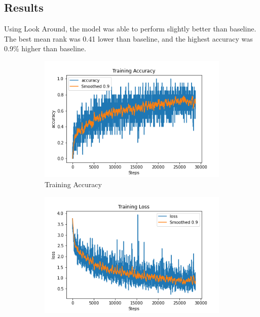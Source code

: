 \subsection{Results}
Using Look Around, the model was able to perform slightly better than baseline. The best mean rank was 0.41 lower than baseline, and the highest accuracy was 0.9\% higher than baseline. 
\begin{figure}[H]
     \centering
     \begin{subfigure}[b]{0.3\textwidth}
         \centering
         \includegraphics[width=\textwidth]{./figure/results/look_around/training/accuracy.png}
         \caption{Training Accuracy}
         \label{fig:la_t_accuracy}
     \end{subfigure}
     \hfill
     \begin{subfigure}[b]{0.3\textwidth}
         \centering
         \includegraphics[width=\textwidth]{./figure/results/look_around/training/loss.png}

\end{subfigure}
\end{figure}

